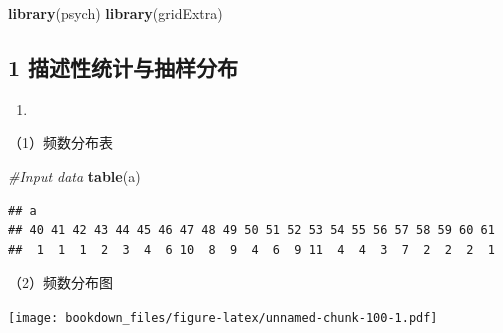 \documentclass[]{ctexbook}
\newenvironment{Shaded}{\begin{snugshade}}{\end{snugshade}}
\newcommand{\CommentTok}[1]{\textcolor[rgb]{0.56,0.35,0.01}{\textit{#1}}}
\newcommand{\DataTypeTok}[1]{\textcolor[rgb]{0.13,0.29,0.53}{#1}}
\newcommand{\DecValTok}[1]{\textcolor[rgb]{0.00,0.00,0.81}{#1}}
\newcommand{\FloatTok}[1]{\textcolor[rgb]{0.00,0.00,0.81}{#1}}
\newcommand{\KeywordTok}[1]{\textcolor[rgb]{0.13,0.29,0.53}{\textbf{#1}}}
\newcommand{\NormalTok}[1]{#1}
\newcommand{\OperatorTok}[1]{\textcolor[rgb]{0.81,0.36,0.00}{\textbf{#1}}}
\newcommand{\StringTok}[1]{\textcolor[rgb]{0.31,0.60,0.02}{#1}}
\begin{document}
\begin{Shaded}
\begin{Highlighting}[]
\KeywordTok{library}\NormalTok{(psych)}
\KeywordTok{library}\NormalTok{(gridExtra)}
\end{Highlighting}
\end{Shaded}

\hypertarget{ux63cfux8ff0ux6027ux7edfux8ba1ux4e0eux62bdux6837ux5206ux5e03-1}{%
\subsection{1 描述性统计与抽样分布}\label{ux63cfux8ff0ux6027ux7edfux8ba1ux4e0eux62bdux6837ux5206ux5e03-1}}

\begin{enumerate}
\def\labelenumi{\arabic{enumi}.}
\item
\end{enumerate}

（1）频数分布表

\begin{Shaded}
\begin{Highlighting}[]
\CommentTok{#Input data}
\KeywordTok{table}\NormalTok{(a)}
\end{Highlighting}
\end{Shaded}

\begin{verbatim}
## a
## 40 41 42 43 44 45 46 47 48 49 50 51 52 53 54 55 56 57 58 59 60 61 
##  1  1  1  2  3  4  6 10  8  9  4  6  9 11  4  4  3  7  2  2  2  1
\end{verbatim}

（2）频数分布图

\begin{Shaded}
\end{Shaded}

\texttt{[image: bookdown\_files/figure-latex/unnamed-chunk-100-1.pdf]}

\begin{Shaded}
\end{Shaded}
\end{document}
